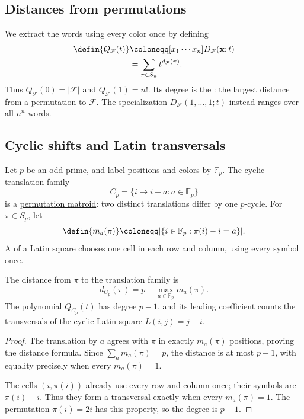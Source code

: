 \subsection[permutationCovering]{Distances from permutations}

We extract the words using every color once by defining
\[
 \begin{aligned}
 \defin{Q_{\mathcal F}(t)}
 &\coloneqq[x_1\dotsm x_n]D_{\mathcal F}(\mathbf x;t)\\
 &=\sum_{\pi\in S_n}t^{d_{\mathcal F}(\pi)}.
 \end{aligned}
\]
Thus $Q_{\mathcal F}(0)=|\mathcal F|$ and $Q_{\mathcal F}(1)=n!$.
Its degree is the : the largest
distance from a permutation to $\mathcal F$.
The specialization $D_{\mathcal F}(1,\dotsc,1;t)$ instead ranges over
all $n^n$ words.

\subsection[cyclicLatinTransversals]{Cyclic shifts and Latin transversals}

Let $p$ be an odd prime, and label positions and colors by $\mathbb F_p$.
The cyclic translation family
\[
 C_p=\{i\mapsto i+a:a\in\mathbb F_p\}
\]
is a \href{permutations.htm#permutationGroups}{permutation matroid}:
two distinct translations differ by one $p$-cycle.
For $\pi\in S_p$, let
\[
 \defin{m_a(\pi)}\coloneqq
 |\{i\in\mathbb F_p:\pi(i)-i=a\}|.
\]
A  of a Latin square chooses one cell in each row
and column, using every symbol once.

\begin{proposition}
The distance from $\pi$ to the translation family is
\[
 d_{C_p}(\pi)=p-\max_{a\in\mathbb F_p}m_a(\pi).
\]
The polynomial $Q_{C_p}(t)$ has degree $p-1$, and its leading
coefficient counts the transversals of the cyclic Latin square
$L(i,j)=j-i$.
\end{proposition}

\begin{proof}
The translation by $a$ agrees with $\pi$ in exactly $m_a(\pi)$
positions, proving the distance formula. Since $\sum_a m_a(\pi)=p$,
the distance is at most $p-1$, with equality precisely when every
$m_a(\pi)=1$.

The cells $(i,\pi(i))$ already
use every row and column once; their symbols are $\pi(i)-i$.
Thus they form a transversal exactly when every $m_a(\pi)=1$.
The permutation $\pi(i)=2i$ has this property, so the degree is $p-1$.
\end{proof}

